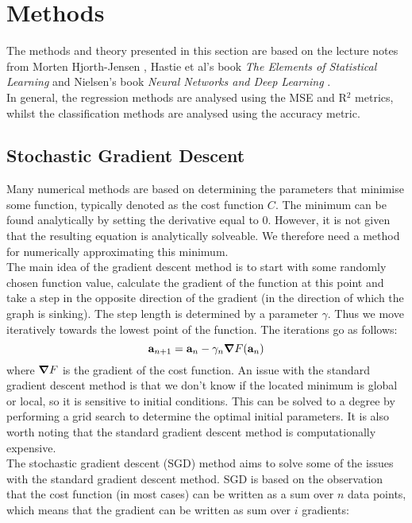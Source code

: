 \documentclass[notitlepage, reprint, nofootinbib]{revtex4-1}
\begin{document}
\section{Methods}
The methods and theory presented in this section are based on the lecture notes from Morten Hjorth-Jensen \cite{lecturenotes3}\cite{lecturenotes1}\cite{lecturenotes2}, Hastie et al's book \emph{The Elements of Statistical Learning} \cite{ESL} and Nielsen's book \emph{Neural Networks and Deep Learning} \cite{nielsen}.\\[2mm]
In general, the regression methods are analysed using the MSE and R$^2$ metrics, whilst the classification methods are analysed using the accuracy metric.

\subsection{Stochastic Gradient Descent}
Many numerical methods are based on determining the parameters that minimise some function, typically denoted as the cost function $C$. The minimum can be found analytically by setting the derivative equal to 0. However, it is not given that the resulting equation is analytically solveable. We therefore need a method for numerically approximating this minimum. \\[2mm]
The main idea of the gradient descent method is to start with some randomly chosen function value, calculate the gradient of the function at this point and take a step in the opposite direction of the gradient (in the direction of which the graph is sinking). The step length is determined by a parameter $\gamma$. Thus we move iteratively towards the lowest point of the function. The iterations go as follows: 
\begin{equation}\label{gd}\vb{a}_{n+1}=\vb{a}_n-\gamma_n\grad F(\vb{a}_n)\end{equation}
where $\grad F$ is the gradient of the cost function. An issue with the standard gradient descent method is that we don't know if the located minimum is global or local, so it is sensitive to initial conditions. This can be solved to a degree by performing a grid search to determine the optimal initial parameters. It is also worth noting that the standard gradient descent method is computationally expensive. \\[2mm]
The stochastic gradient descent (SGD) method aims to solve some of the issues with the standard gradient descent method. SGD is based on the observation that the cost function (in most cases) can be written as a sum over $n$ data points, which means that the gradient can be written as sum over $i$ gradients: 
\end{document}
